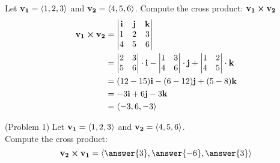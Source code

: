 \documentclass[handout]{ximera}
\begin{document}
\begin{example}[Example 1]
Let $\mathbf{v_1} = \left\langle 1,2,3\right\rangle$ and $\mathbf{v_2} = \left\langle 4, 5, 6\right\rangle$.  
Compute the cross product: $\mathbf{v_1} \boldsymbol\times \mathbf{v_2}$\\
\begin{align*}
\mathbf{v_1} \boldsymbol\times \mathbf{v_2} &= \begin{vmatrix}
\mathbf{i} & \mathbf{j} & \mathbf{k}\\
1 & 2 & 3\\
4 & 5 & 6
\end{vmatrix}\\ 
&= \begin{vmatrix}
 2 & 3  \\
 5 & 6 \\
 \end{vmatrix} \cdot \mathbf i
 - \begin{vmatrix}
 1 & 3  \\
 4 & 6 \\
 \end{vmatrix} \cdot \mathbf j
 + \begin{vmatrix}
 1 & 2  \\
 4 & 5 \\
 \end{vmatrix} \cdot \mathbf k\\
 &= (12-15)\mathbf i - (6 - 12) \mathbf j + (5-8) \mathbf k\\
 &= -3\mathbf i + 6 \mathbf j -3 \mathbf k\\
 &= \left\langle -3, 6, -3\right\rangle
 \end{align*}
 \end{example}

\begin{problem}(Problem 1)
Let $\mathbf{v_1} = \left\langle 1,2,3\right\rangle$ and $\mathbf{v_2} = \left\langle 4, 5, 6\right\rangle$.\\  
Compute the cross product: 
\[
\vec{v_2} \cross \vec{v_1} = \vector{\answer{3}, \answer{-6}, \answer{3}}
\]
\end{problem}
\end{document}
